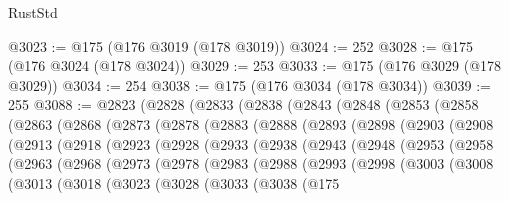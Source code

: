 \begin{lexlean}{RustStd}
\begin{coremodule}
@3023 := @175 (@176 @3019 (@178 @3019))
@3024 := 252
@3028 := @175 (@176 @3024 (@178 @3024))
@3029 := 253
@3033 := @175 (@176 @3029 (@178 @3029))
@3034 := 254
@3038 := @175 (@176 @3034 (@178 @3034))
@3039 := 255
@3088 := @2823
    (@2828
      (@2833
        (@2838
          (@2843
            (@2848
              (@2853
                (@2858
                  (@2863
                    (@2868
                      (@2873
                        (@2878
                          (@2883
                            (@2888
                              (@2893
                                (@2898
                                  (@2903
                                    (@2908
                                      (@2913
                                        (@2918
                                          (@2923
                                            (@2928
                                              (@2933
                                                (@2938
                                                  (@2943
                                                    (@2948
                                                      (@2953
                                                        (@2958
                                                          (@2963
                                                            (@2968
                                                              (@2973
                                                                (@2978
                                                                  (@2983
                                                                    (@2988
                                                                      (@2993
                                                                        (@2998
                                                                          (@3003
                                                                            (@3008
                                                                              (@3013
                                                                                (@3018
                                                                                  (@3023
                                                                                    (@3028
                                                                                      (@3033
                                                                                        (@3038
                                                                                          (@175

\end{coremodule}
\end{lexlean}

